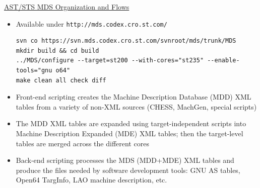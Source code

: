\documentclass[a4]{seminar}
\begin{document}
\begin{slide}

\begin{center} \underline{AST/STS MDS Organization and Flows} \end{center}

\begin{itemize}

\item Available under \texttt{http://mds.codex.cro.st.com/}

{\scriptsize
\begin{verbatim}
svn co https://svn.mds.codex.cro.st.com/svnroot/mds/trunk/MDS
mkdir build && cd build
../MDS/configure --target=st200 --with-cores="st235" --enable-tools="gnu o64"
make clean all check diff
\end{verbatim}
}

\item Front-end scripting creates the Machine Description Database (MDD) XML
tables from a variety of non-XML sources (CHESS, MachGen, special scripts)

\item The MDD XML tables are expanded using target-independent scripts into
Machine Description Expanded (MDE) XML tables; then the target-level
tables are merged across the different cores

\item Back-end scripting processes the MDS (MDD+MDE) XML tables and produce the
files needed by software development tools:  GNU AS tables, Open64 TargInfo, LAO
machine description, etc.

\end{itemize}

\end{slide}


\begin{slide}

\begin{center}
\end{center}

\end{slide}
\end{document}

